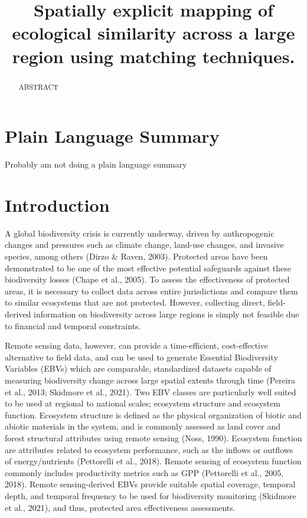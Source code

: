 \documentclass[
]{agujournal2019}
\begin{document}
\title{Spatially explicit mapping of ecological similarity across a
large region using matching techniques.}



\begin{abstract}
ABSTRACT
\end{abstract}

\section*{Plain Language Summary}
Probably am not doing a plain language summary



\section{Introduction}\label{introduction}

A global biodiversity crisis is currently underway, driven by
anthropogenic changes and pressures such as climate change, land-use
changes, and invasive species, among others (Dirzo \& Raven, 2003).
Protected areas have been demonstrated to be one of the most effective
potential safeguards against these biodiversity losses (Chape et al.,
2005). To assess the effectiveness of protected areas, it is necessary
to collect data across entire jurisdictions and compare them to similar
ecosystems that are not protected. However, collecting direct,
field-derived information on biodiversity across large regions is simply
not feasible due to financial and temporal constraints.

Remote sensing data, however, can provide a time-efficient,
cost-effective alternative to field data, and can be used to generate
Essential Biodiversity Variables (EBVs) which are comparable,
standardized datasets capable of measuring biodiversity change across
large spatial extents through time (Pereira et al., 2013; Skidmore et
al., 2021). Two EBV classes are particularly well suited to be used at
regional to national scales; ecosystem structure and ecosystem function.
Ecosystem structure is defined as the physical organization of biotic
and abiotic materials in the system, and is commonly assessed as land
cover and forest structural attributes using remote sensing (Noss,
1990). Ecosystem function are attributes related to ecosystem
performance, such as the inflows or outflows of energy/nutrients
(Pettorelli et al., 2018). Remote sensing of ecosystem function commonly
includes productivity metrics such as GPP (Pettorelli et al., 2005,
2018). Remote sensing-derived EBVs provide suitable spatial coverage,
temporal depth, and temporal frequency to be used for biodiversity
monitoring (Skidmore et al., 2021), and thus, protected area
effectiveness assessments.
\end{document}
